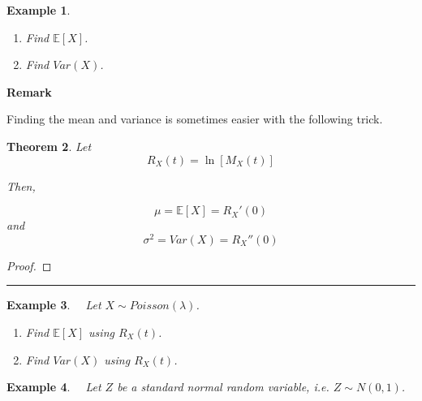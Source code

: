 \documentclass[12pt]{amsart}
\newtheorem{theorem}{Theorem}[section]
\newtheorem{example}[theorem]{Example}
\newcommand\Ebb{\mathbb{E}}
\newcommand\gs{\sigma}
\newcommand\gl{\lambda}
\newcommand\mgfX{M_X(t)}
\begin{document}
{\begin{example}
\begin{enumerate}
\vspace{8cm}

\item Find $\Ebb[X]$.

\vspace{6cm}

\item Find $Var(X)$.


\end{enumerate}

\end{example}


\newpage

\textbf{Remark} 

Finding the mean and variance is sometimes easier with the following trick.

\vspace{.5cm}
\begin{theorem}
Let $$R_X(t) = \ln[\mgfX]$$

Then,

$$\mu = \Ebb[X] = R_X'(0)$$
and
$$\gs^2 = Var(X) = R_X''(0)$$
\end{theorem}
\begin{proof}
\end{proof}


\vspace{6cm}
\hrule
\vspace{.5cm}


\begin{example} \ \  Let $X \sim Poisson(\gl)$. 

\begin{enumerate}
\item Find $\Ebb[X]$ using $R_X(t)$.

\vspace{6cm}

\item Find $Var(X)$ using $R_X(t)$.


\end{enumerate}

\end{example}




\newpage

\begin{example} \ \  Let $Z$ be a standard normal random variable, i.e. $Z \sim N(0,1)$. 


\end{example}}
\end{document}

